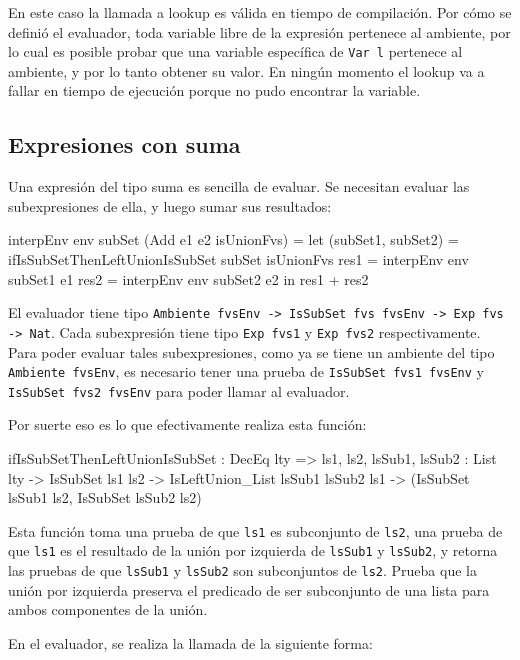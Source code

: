 En este caso la llamada a lookup es válida en tiempo de compilación. Por cómo se definió el evaluador, toda variable libre de la expresión pertenece al ambiente, por lo cual es posible probar que una variable específica de \texttt{Var l} pertenece al ambiente, y por lo tanto obtener su valor. En ningún momento el lookup va a fallar en tiempo de ejecución porque no pudo encontrar la variable.

\subsection{Expresiones con suma}

Una expresión del tipo suma es sencilla de evaluar. Se necesitan evaluar las subexpresiones de ella, y luego sumar sus resultados:

\begin{code}
interpEnv env subSet (Add e1 e2 isUnionFvs) = 
  let (subSet1, subSet2) = 
        ifIsSubSetThenLeftUnionIsSubSet subSet isUnionFvs
      res1 = interpEnv env subSet1 e1
      res2 = interpEnv env subSet2 e2
  in res1 + res2
\end{code}

El evaluador tiene tipo \texttt{Ambiente fvsEnv -> IsSubSet fvs fvsEnv -> Exp fvs -> Nat}. Cada subexpresión tiene tipo \texttt{Exp fvs1} y \texttt{Exp fvs2} respectivamente. Para poder evaluar tales subexpresiones, como ya se tiene un ambiente del tipo \texttt{Ambiente fvsEnv}, es necesario tener una prueba de \texttt{IsSubSet fvs1 fvsEnv} y \texttt{IsSubSet fvs2 fvsEnv} para poder llamar al evaluador.

Por suerte eso es lo que efectivamente realiza esta función:

\begin{code}
ifIsSubSetThenLeftUnionIsSubSet : DecEq lty => 
  {ls1, ls2, lsSub1, lsSub2 : List lty} -> IsSubSet ls1 ls2 -> 
  IsLeftUnion_List lsSub1 lsSub2 ls1 -> 
  (IsSubSet lsSub1 ls2, IsSubSet lsSub2 ls2)
\end{code}

Esta función toma una prueba de que \texttt{ls1} es subconjunto de \texttt{ls2}, una prueba de que \texttt{ls1} es el resultado de la unión por izquierda de \texttt{lsSub1} y \texttt{lsSub2}, y retorna las pruebas de que \texttt{lsSub1} y \texttt{lsSub2} son subconjuntos de \texttt{ls2}. Prueba que la unión por izquierda preserva el predicado de ser subconjunto de una lista para ambos componentes de la unión.

En el evaluador, se realiza la llamada de la siguiente forma:

